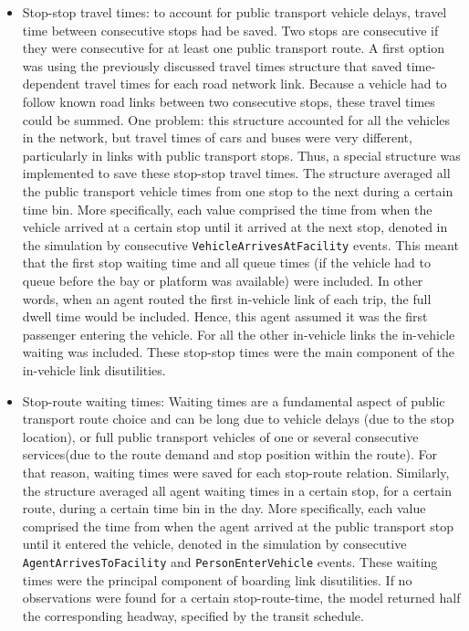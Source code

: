 \begin{itemize}\styleItemize
\item Stop-stop travel times: to account for public transport vehicle delays, travel time between consecutive stops had be saved. Two stops are consecutive if they were consecutive for at least one public transport route. A first option was using the previously discussed travel times structure that saved time-dependent travel times for each road network link. Because a vehicle had to follow known road links between two consecutive stops, these travel times could be summed. One problem: this structure accounted for all the vehicles in the network, but  travel times of cars and buses were very different, particularly in links with public transport stops. Thus, a special structure was implemented to save these stop-stop travel times. The structure averaged all the public transport vehicle times from one stop to the next during a certain time bin. More specifically, each value comprised the time from when the vehicle arrived at a certain stop until it arrived at the next stop, denoted in the simulation by consecutive \lstinline|VehicleArrivesAtFacility| events. This meant that the first stop waiting time and all queue times (if the vehicle had to queue before the bay or platform was available) were included. In other words, when an agent routed the first in-vehicle link of each trip, the full dwell time would be included. Hence, this agent assumed it was the first passenger entering the vehicle. For all the other in-vehicle links the in-vehicle waiting was included. These stop-stop times were the main component of the in-vehicle link disutilities.
%
\item Stop-route waiting times: Waiting times are a fundamental aspect of public transport route choice and can be long due to vehicle delays (\ie due to the stop location), or full public transport vehicles of one or several consecutive services(\ie due to the route demand and stop position within the route). For that reason, waiting times were saved for each stop-route relation. Similarly, the structure averaged all agent waiting times in a certain stop, for a certain route, during a certain time bin in the day. More specifically, each value comprised the time from when the agent arrived at the public transport stop until it entered the vehicle, denoted in the simulation by consecutive \lstinline|AgentArrivesToFacility| and \lstinline|PersonEnterVehicle| \glspl{event}. These waiting times were the principal component of  boarding link disutilities. If no observations were found for a certain stop-route-time, the model returned half the corresponding headway, specified by the transit schedule.

\end{itemize}
